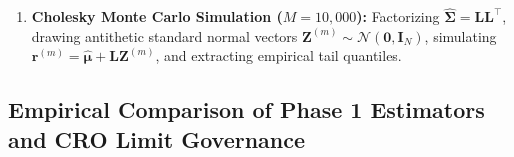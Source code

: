 \documentclass[11pt,a4paper]{article}
\begin{document}
\begin{enumerate}
    \begin{equation}
    z_{\text{CF}}(\alpha) = z_\alpha + \frac{1}{6}(z_\alpha^2 - 1)\hat{S}_L + \frac{1}{24}(z_\alpha^3 - 3z_\alpha)\hat{K}_{\text{ex}} - \frac{1}{36}(2z_\alpha^3 - 5z_\alpha)\hat{S}_L^2
    \end{equation}
    \item \textbf{Cholesky Monte Carlo Simulation ($M = 10,000$):} Factorizing $\hat{\mathbf{\Sigma}} = \mathbf{L}\mathbf{L}^\top$, drawing antithetic standard normal vectors $\mathbf{Z}^{(m)} \sim \mathcal{N}(\mathbf{0}, \mathbf{I}_N)$, simulating $\mathbf{r}^{(m)} = \hat{\boldsymbol{\mu}} + \mathbf{L}\mathbf{Z}^{(m)}$, and extracting empirical tail quantiles.
\end{enumerate}

\subsection{Empirical Comparison of Phase 1 Estimators and CRO Limit Governance}
\end{document}
